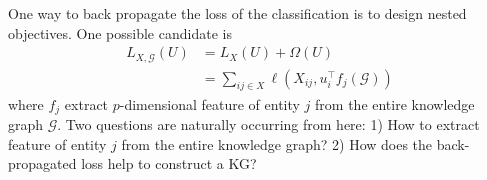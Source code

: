 \documentclass{article} %
\theoremstyle{definition}
\begin{document}
One way to back propagate the loss of the classification is to design nested objectives. One possible candidate is
\begin{align}
L_{X, \mathcal{G}}(U) & = L_X(U) + \Omega(U)\\
& = \sum_{ij \in X}\ell(X_{ij}, u_{i}^\top f_j(\mathcal{G}))
\end{align}
where $f_j$ extract $p$-dimensional feature of entity $j$ from the entire knowledge graph $\mathcal{G}$. Two questions are naturally occurring from here: 1) How to extract feature of entity $j$ from the entire knowledge graph? 2) How does the back-propagated loss help to construct a KG?




\end{document}
